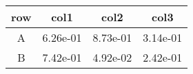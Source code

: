 \begin{tabular}{cccc}
\toprule
row&col1&col2&col3\tabularnewline
\midrule
A&6.26e-01&8.73e-01&3.14e-01\tabularnewline
B&7.42e-01&4.92e-02&2.42e-01\tabularnewline
\bottomrule
\end{tabular}
